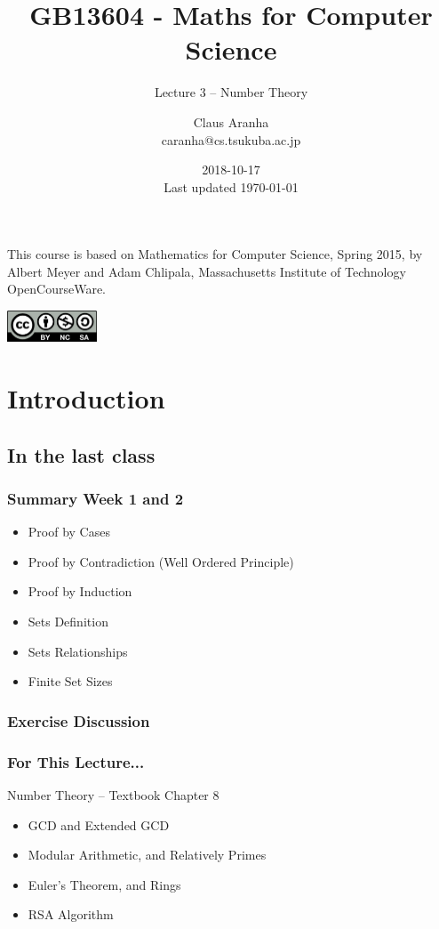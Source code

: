 \documentclass{beamer}
\title[GB13604]{GB13604 - Maths for Computer Science}
\subtitle[]{Lecture 3 -- Number Theory}
\author[Claus Aranha]{Claus Aranha\\{\footnotesize caranha@cs.tsukuba.ac.jp}}
\institute[COINS]{College of Information Science}
\date[2018-10-17]{2018-10-17\\{\tiny Last updated \today}}
\begin{document}
\begin{frame}
  \maketitle

  \begin{center}
    {\smaller This course is based on Mathematics for Computer Science, Spring
    2015, by Albert Meyer and Adam Chlipala, Massachusetts Institute
    of Technology OpenCourseWare.}
    
    \includegraphics[width=0.2\textwidth]{../img/by-nc-sa}
  \end{center}
\end{frame}

\section{Introduction}

\subsection{In the last class}
\begin{frame}
  \frametitle{Summary Week 1 and 2}

  {\larger
  \begin{itemize}
  \item Proof by Cases
  \item Proof by Contradiction (Well Ordered Principle)
  \item Proof by Induction
  \item Sets Definition
  \item Sets Relationships
  \item Finite Set Sizes
  \end{itemize}
  }
\end{frame}

\begin{frame}
  \frametitle{Exercise Discussion}
\end{frame}

\begin{frame}
  \frametitle{For This Lecture...}

  {\larger
  
    Number Theory -- Textbook Chapter 8    
  
  \bigskip
  
  \begin{itemize}
  \item GCD and Extended GCD
  \item Modular Arithmetic, and Relatively Primes
  \item Euler's Theorem, and Rings
  \item RSA Algorithm
  \end{itemize}

  }
\end{frame}
\end{document}

